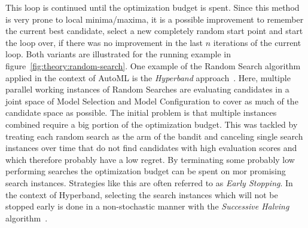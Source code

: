 This loop is continued until the optimization budget is spent. Since this method is very prone to local minima/maxima, it is a possible improvement to remember the current best candidate, select a new completely random start point and start the loop over, if there was no improvement in the last $n$ iterations of the current loop.
Both variants are illustrated for the running example in figure~\ref{fig:theory:random-search}.\newline
One example of the Random Search algorithm applied in the context of AutoML is the \textit{Hyperband} approach~\cite{Li-Hyperband}.
Here, multiple parallel working instances of Random Searches are evaluating candidates in a joint space of Model Selection and Model Configuration to cover as much of the candidate space as possible.
The initial problem is that multiple instances combined require a big portion of the optimization budget.
This was tackled by treating each random search as the arm of the bandit and canceling single search instances over time that do not find candidates with high evaluation scores and which therefore probably have a low regret.
By terminating some probably low performing searches the optimization budget can be spent on mor promising search instances.
Strategies like this are often referred to as \textit{Early Stopping}.
In the context of Hyperband, selecting the search instances which will not be stopped early is done in a non-stochastic manner with the \textit{Successive Halving} algorithm~\cite{Jamieson-SuccessiveHalving}.
